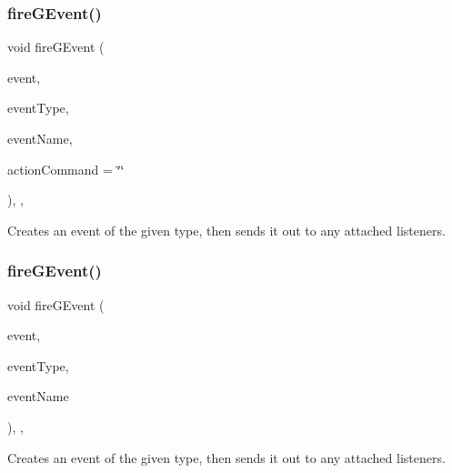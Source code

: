 \subsubsection{\texorpdfstring{fire\+G\+Event()}{fireGEvent()}\hspace{0.1cm}{\footnotesize\ttfamily [4/8]}}
{\footnotesize\ttfamily void fire\+G\+Event (\begin{DoxyParamCaption}\item[{Q\+Mouse\+Event $\ast$}]{event,  }\item[{\mbox{\hyperlink{namespacesgl_a2628ea8d12e8b2563c32f05dc7fff6fa}{Event\+Type}}}]{event\+Type,  }\item[{const std\+::string \&}]{event\+Name,  }\item[{const std\+::string \&}]{action\+Command = {\ttfamily \char`\"{}\char`\"{}} }\end{DoxyParamCaption})\hspace{0.3cm}{\ttfamily [protected]}, {\ttfamily [virtual]}, {\ttfamily [inherited]}}



Creates an event of the given type, then sends it out to any attached listeners. 

\mbox{\label{classsgl_1_1GObservable_a63fd9034e1e1633c1c38eb342bfd34e9}} 
\subsubsection{\texorpdfstring{fire\+G\+Event()}{fireGEvent()}\hspace{0.1cm}{\footnotesize\ttfamily [5/8]}}
{\footnotesize\ttfamily void fire\+G\+Event (\begin{DoxyParamCaption}\item[{Q\+Resize\+Event $\ast$}]{event,  }\item[{\mbox{\hyperlink{namespacesgl_a2628ea8d12e8b2563c32f05dc7fff6fa}{Event\+Type}}}]{event\+Type,  }\item[{const std\+::string \&}]{event\+Name }\end{DoxyParamCaption})\hspace{0.3cm}{\ttfamily [protected]}, {\ttfamily [virtual]}, {\ttfamily [inherited]}}



Creates an event of the given type, then sends it out to any attached listeners. 

